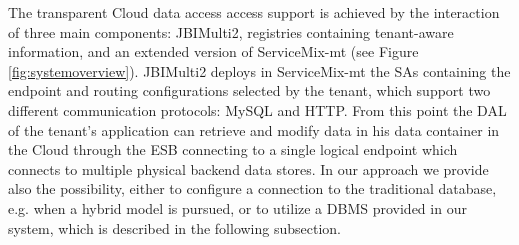The transparent Cloud data access access support is achieved by the interaction of three main components: JBIMulti2, registries containing tenant-aware information, and an extended version of ServiceMix-mt (see Figure \ref{fig:systemoverview}). JBIMulti2 deploys in ServiceMix-mt the \ac{SA}s containing the endpoint and routing configurations selected by the tenant, which support two different communication protocols: MySQL and \ac{HTTP}. From this point the DAL of the tenant's application can retrieve and modify data in his data container in the Cloud through the \ac{ESB} connecting to a single logical endpoint which connects to multiple physical backend data stores. In our approach we provide also the possibility, either to configure a connection to the traditional database, e.g. when a hybrid model is pursued, or to utilize a \ac{DBMS} provided in our system, which is described in the following subsection.



\FloatBarrier
\newpage